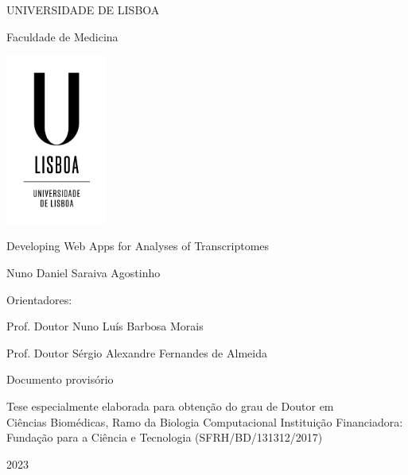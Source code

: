 \documentclass[12pt, twoside]{report}
\begin{document}
\begin{titlepage}
    \begin{center}
        \vspace*{-.2cm}
        UNIVERSIDADE DE LISBOA
        
        Faculdade de Medicina
        
        \includegraphics[width=0.25\textwidth]{images/logo/ulisboa-only}
        
        \vspace{1.8cm}
        Developing Web Apps for Analyses of Transcriptomes

        \vspace{1.1cm}        
            
        \vspace{0.9cm}            
        Nuno Daniel Saraiva Agostinho
    \end{center}

    \vspace{0.9cm}
    Orientadores:

      Prof. Doutor Nuno Luís Barbosa Morais

      Prof. Doutor Sérgio Alexandre Fernandes de Almeida
    
    \vspace{2cm}
    \begin{center}
        Documento provisório
        
        Tese especialmente elaborada para obtenção do grau de Doutor em\\
        Ciências Biomédicas, Ramo da Biologia Computacional    
        \vfill
        Instituição Financiadora:
        Fundação para a Ciência e Tecnologia (SFRH/BD/131312/2017)
        
        2023
        \vspace{.7cm}
    \end{center}
\end{titlepage}
\end{document}

